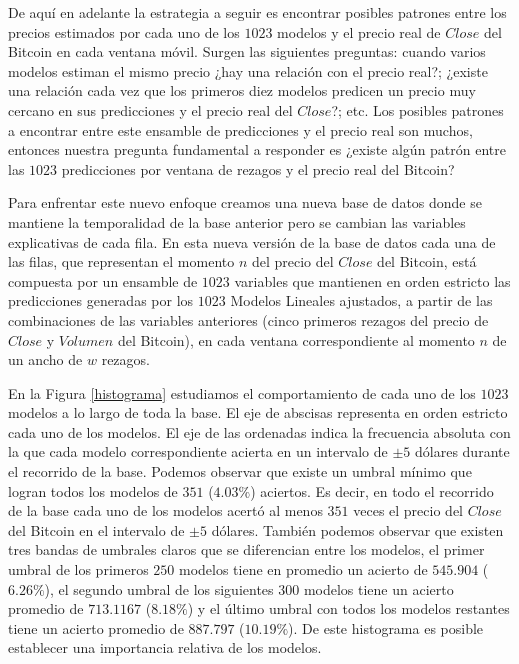 \documentclass[a4paper,12pt,twocolumn]{article}
\begin{document}
De aquí en adelante la estrategia a seguir es  encontrar posibles patrones entre los precios estimados por cada uno de los $1023$ modelos y el precio real de $Close$ del Bitcoin en cada ventana móvil. Surgen las siguientes preguntas: cuando varios modelos estiman el mismo precio ¿hay una relación con el precio real?; ¿existe una relación cada vez que los primeros diez modelos predicen un precio muy cercano en sus predicciones y el precio real del $Close$?; etc. Los posibles patrones a encontrar entre este ensamble de predicciones y el precio real son muchos, entonces nuestra pregunta fundamental a responder es ¿existe algún patrón entre las $1023$ predicciones por ventana de rezagos y el precio real del Bitcoin?

Para enfrentar este nuevo enfoque creamos una nueva base de datos donde se mantiene la temporalidad de la base anterior pero se cambian las variables explicativas de cada fila. En esta nueva versión de la base de datos cada una de las filas, que representan el momento $n$ del precio del $Close$ del Bitcoin, está compuesta por un ensamble de $1023$ variables que mantienen en orden estricto las predicciones generadas por los $1023$ Modelos Lineales ajustados, a partir de las combinaciones de las variables anteriores (cinco primeros rezagos del precio de $Close$ y $Volumen$ del Bitcoin), en cada ventana correspondiente al momento $n$ de un ancho de $w$ rezagos.

En la Figura \ref{histograma} estudiamos el comportamiento de cada uno de los $1023$ modelos a lo largo de toda la base. El eje de abscisas representa en orden estricto cada uno de los modelos. El eje de las ordenadas indica la frecuencia absoluta con la que cada modelo correspondiente acierta en un intervalo de $\pm 5$ dólares durante el recorrido de la base. Podemos observar que existe un umbral mínimo que logran todos los modelos de $351$ ($4.03\%$) aciertos. Es decir, en todo el recorrido de la base cada uno de los modelos acertó al menos $351$ veces el precio del $Close$ del Bitcoin en el intervalo de $\pm 5$ dólares. También podemos observar que existen tres bandas de umbrales claros que se diferencian entre los modelos, el primer umbral de los primeros $250$ modelos tiene en promedio un acierto de $545.904$ ($6.26\%$), el segundo umbral de los siguientes $300$ modelos tiene un acierto promedio de $713.1167$ ($8.18\%$) y el último umbral con todos los modelos restantes tiene un acierto promedio de $887.797$ ($10.19\%$). De este histograma es posible establecer una importancia relativa de los modelos.
 
\end{document}
